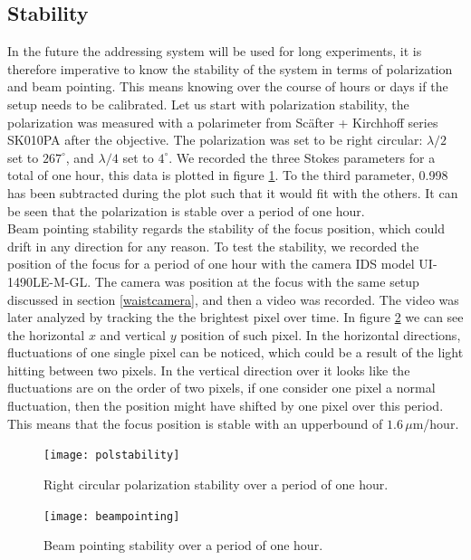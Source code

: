 \subsection{Stability}
In the future the addressing system will be used for long experiments, it is therefore imperative to know the stability of the system in terms of polarization and beam pointing.
This means knowing over the course of hours or days if the setup needs to be calibrated. Let us start with polarization stability, the polarization was measured with a polarimeter from Sc\"after + Kirchhoff series SK010PA after the objective. The polarization was set to be right circular: $\lambda/2$ set to $267^\circ$, and $\lambda/4$ set to $4^\circ$. We recorded the three Stokes parameters for a total of one hour, this data is plotted in figure \ref{polstability}. To the third parameter, 0.998 has been subtracted during the plot such that it would fit with the others. It can be seen that the polarization is stable over a period of one hour.\\
Beam pointing stability regards the stability of the focus position, which could drift in any direction for any reason. To test the stability, we recorded the position of the focus for a period of one hour with the camera IDS model UI-1490LE-M-GL. The camera was position at the focus with the same setup discussed in section \ref{waistcamera}, and then a video was recorded. The video was later analyzed by tracking the the brightest pixel over time. In figure \ref{beampointing} we can see the horizontal $x$ and vertical $y$ position of such pixel. In the horizontal directions, fluctuations of one single pixel can be noticed, which could be a result of the light hitting between two pixels. In the vertical direction over it looks like the fluctuations are on the order of two pixels, if one consider one pixel a normal fluctuation, then the position might have shifted by one pixel over this period. This means that the focus position is stable with an upperbound of $1.6\,\mu$m/hour.

\begin{figure}[H]
\centering
\texttt{[image: polstability]}
\caption{Right circular polarization stability over a period of one hour.}
\label{polstability}
\end{figure}

\begin{figure}[H]
\centering
\texttt{[image: beampointing]}
\caption{Beam pointing stability over a period of one hour.}
\label{beampointing}
\end{figure}


